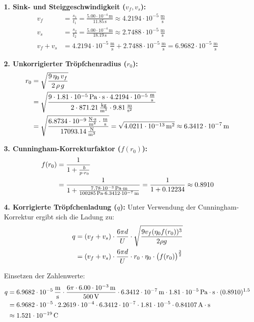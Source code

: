 \documentclass[12pt,a4paper,titlepage]{scrartcl}
\numberwithin{equation}{section}
\numberwithin{table}{section}
\numberwithin{figure}{section}
\begin{document}
\noindent
\textbf{1. Sink- und Steiggeschwindigkeit ($v_f, v_s$):}
\begin{align}
    v_f &= \frac{s_1}{t_1} = \frac{5.00 \cdot 10^{-4}\,\text{m}}{11.85\,\text{s}} \approx 4.2194 \cdot 10^{-5}\,\frac{\text{m}}{\text{s}} \\
    v_s &= \frac{s_2}{t_2} = \frac{5.00 \cdot 10^{-4}\,\text{m}}{18.19\,\text{s}} \approx 2.7488 \cdot 10^{-5}\,\frac{\text{m}}{\text{s}} \\
    v_f + v_s &= 4.2194 \cdot 10^{-5}\,\frac{\text{m}}{\text{s}} + 2.7488 \cdot 10^{-5}\,\frac{\text{m}}{\text{s}} = 6.9682 \cdot 10^{-5}\,\frac{\text{m}}{\text{s}}
\end{align}

\medskip
\noindent
\textbf{2. Unkorrigierter Tröpfchenradius ($r_0$):}
\begin{align}
    r_0 &= \sqrt{\frac{9\,\eta_0\,v_f}{2\,\rho\,g}} \notag \\
        &= \sqrt{\frac{9 \cdot 1.81 \cdot 10^{-5}\,\text{Pa}\cdot\text{s} \cdot 4.2194 \cdot 10^{-5}\,\frac{\text{m}}{\text{s}}}{2 \cdot 871.21\,\frac{\text{kg}}{\text{m}^3} \cdot 9.81\,\frac{\text{m}}{\text{s}^2}}} \notag \\
        &= \sqrt{\frac{6.8734 \cdot 10^{-9}\,\frac{\text{N}\cdot\text{s}}{\text{m}^2}\cdot\frac{\text{m}}{\text{s}}}{17093.14\,\frac{\text{N}}{\text{m}^3}}} = \sqrt{4.0211 \cdot 10^{-13}\,\text{m}^2} \approx 6.3412 \cdot 10^{-7}\,\text{m}
\end{align}

\medskip
\noindent
\textbf{3. Cunningham-Korrekturfaktor ($f(r_0)$):}
\begin{align}
    f(r_0) &= \frac{1}{1 + \frac{b}{p \cdot r_0}} \notag \\
           &= \frac{1}{1 + \frac{7.78 \cdot 10^{-3}\,\text{Pa}\cdot\text{m}}{100285\,\text{Pa} \cdot 6.3412 \cdot 10^{-7}\,\text{m}}} = \frac{1}{1 + 0.12234} \approx 0.8910
\end{align}

\medskip
\noindent
\textbf{4. Korrigierte Tröpfchenladung ($q$):}
Unter Verwendung der Cunningham-Korrektur ergibt sich die Ladung zu:
\begin{align}
    q &= (v_f + v_s) \cdot \frac{6\pi d}{U} \cdot \sqrt{\frac{9 v_f (\eta_0 f(r_0))^3}{2\rho g}} \notag \\
      &= (v_f + v_s) \cdot \frac{6\pi d}{U} \cdot r_0 \cdot \eta_0 \cdot \big(f(r_0)\big)^{\frac{3}{2}}
\end{align}

\noindent
Einsetzen der Zahlenwerte:
\begin{align}
    q &= 6.9682 \cdot 10^{-5}\,\frac{\text{m}}{\text{s}} \cdot \frac{6\pi \cdot 6.00 \cdot 10^{-3}\,\text{m}}{500\,\text{V}} \cdot 6.3412 \cdot 10^{-7}\,\text{m} \cdot 1.81 \cdot 10^{-5}\,\text{Pa}\cdot\text{s} \cdot (0.8910)^{1.5} \notag \\
      &= 6.9682 \cdot 10^{-5} \cdot 2.2619 \cdot 10^{-4} \cdot 6.3412 \cdot 10^{-7} \cdot 1.81 \cdot 10^{-5} \cdot 0.84107\,\text{A}\cdot\text{s} \notag \\
      &\approx 1.521 \cdot 10^{-19}\,\text{C}
\end{align}
\end{document}

